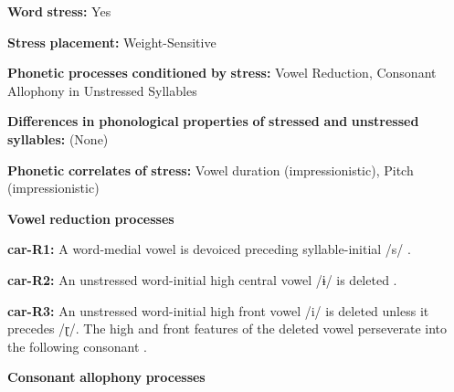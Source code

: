 \begin{styleBody}
\textbf{Word} \textbf{stress:} Yes
\end{styleBody}

\begin{styleBody}
\textbf{Stress} \textbf{placement:} Weight-Sensitive
\end{styleBody}

\begin{styleBody}
\textbf{Phonetic} \textbf{processes} \textbf{conditioned} \textbf{by} \textbf{stress:} Vowel Reduction, Consonant Allophony in Unstressed Syllables
\end{styleBody}

\begin{styleBody}
\textbf{Differences} \textbf{in} \textbf{phonological} \textbf{properties} \textbf{of} \textbf{stressed} \textbf{and} \textbf{unstressed} \textbf{syllables:} (None)
\end{styleBody}

\begin{styleBody}
\textbf{Phonetic} \textbf{correlates} \textbf{of} \textbf{stress:} Vowel duration (impressionistic), Pitch (impressionistic)
\end{styleBody}

\begin{styleBody}
\textbf{Vowel} \textbf{reduction} \textbf{processes}
\end{styleBody}

\begin{styleBody}
\textbf{car-R1:} A word-medial vowel is devoiced preceding syllable-initial /s/ \citep[38]{Peasgood1972}.
\end{styleBody}

\begin{styleBody}
\textbf{car-R2:} An unstressed word-initial high central vowel /ɨ/ is deleted \citep[40]{Courtz2008}.
\end{styleBody}

\begin{styleBody}
\textbf{car-R3:} An unstressed word-initial high front vowel /i/ is deleted unless it precedes /ɽ/. The high and front features of the deleted vowel perseverate into the following consonant \citep[41]{Courtz2008}.
\end{styleBody}

\begin{styleBody}
\textbf{Consonant} \textbf{allophony} \textbf{processes}
\end{styleBody}

